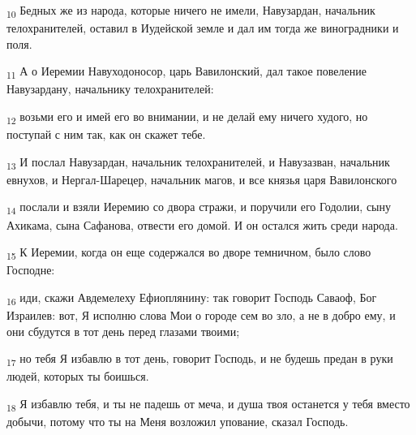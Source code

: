 \begin{tcolorbox}
\textsubscript{10} Бедных же из народа, которые ничего не имели, Навузардан, начальник телохранителей, оставил в Иудейской земле и дал им тогда же виноградники и поля.
\end{tcolorbox}
\begin{tcolorbox}
\textsubscript{11} А о Иеремии Навуходоносор, царь Вавилонский, дал такое повеление Навузардану, начальнику телохранителей:
\end{tcolorbox}
\begin{tcolorbox}
\textsubscript{12} возьми его и имей его во внимании, и не делай ему ничего худого, но поступай с ним так, как он скажет тебе.
\end{tcolorbox}
\begin{tcolorbox}
\textsubscript{13} И послал Навузардан, начальник телохранителей, и Навузазван, начальник евнухов, и Нергал-Шарецер, начальник магов, и все князья царя Вавилонского
\end{tcolorbox}
\begin{tcolorbox}
\textsubscript{14} послали и взяли Иеремию со двора стражи, и поручили его Годолии, сыну Ахикама, сына Сафанова, отвести его домой. И он остался жить среди народа.
\end{tcolorbox}
\begin{tcolorbox}
\textsubscript{15} К Иеремии, когда он еще содержался во дворе темничном, было слово Господне:
\end{tcolorbox}
\begin{tcolorbox}
\textsubscript{16} иди, скажи Авдемелеху Ефиоплянину: так говорит Господь Саваоф, Бог Израилев: вот, Я исполню слова Мои о городе сем во зло, а не в добро ему, и они сбудутся в тот день перед глазами твоими;
\end{tcolorbox}
\begin{tcolorbox}
\textsubscript{17} но тебя Я избавлю в тот день, говорит Господь, и не будешь предан в руки людей, которых ты боишься.
\end{tcolorbox}
\begin{tcolorbox}
\textsubscript{18} Я избавлю тебя, и ты не падешь от меча, и душа твоя останется у тебя вместо добычи, потому что ты на Меня возложил упование, сказал Господь.
\end{tcolorbox}
